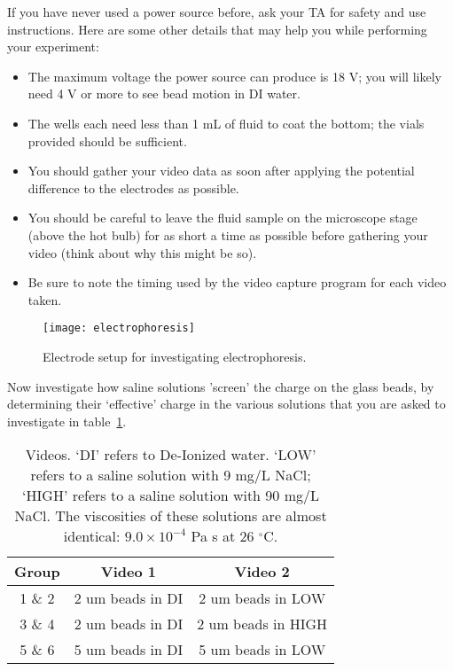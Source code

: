 \noindent
If you have never used a power source before, ask your TA for safety and use instructions. Here are some other details that may help you while performing your experiment:

\begin{itemize}
\itemsep-0.3em
\item The maximum voltage the power source can produce is 18 V; you will likely need 4 V or more to see bead motion in DI water.
\item The wells each need less than 1 mL of fluid to coat the bottom; the vials provided should be sufficient.
\item You should gather your video data as soon after applying the potential difference to the
electrodes as possible.
\item You should be careful to leave the fluid sample on the microscope stage (above the hot
bulb) for as short a time as possible before gathering your video (think about why this might
be so).
\item Be sure to note the timing used by the video capture program for each video taken.
\end{itemize}

\begin{figure}[hbtp]
	\centering
	\texttt{[image: electrophoresis]}
	\caption{Electrode setup for investigating electrophoresis.}
	\label{fig:electroph}
\end{figure}

Now investigate how saline solutions 'screen' the charge on the glass beads, by determining their `effective' charge in the various solutions that you are asked to investigate in table~\ref{tab:lab7-vids}.

\begin{table}[ht]
	\centering
	\begin{tabular}{|c|c|c|}
	\hline 
	\textbf{Group} & \textbf{Video 1} & \textbf{Video 2} \\ 
	\hline 
	1 \& 2 & 2 um beads in DI & 2 um beads in LOW \\ 
	\hline 
	3 \& 4 & 2 um beads in DI & 2 um beads in HIGH \\ 
	\hline 
	5 \& 6 & 5 um beads in DI & 5 um beads in LOW \\ 
	\hline 
	\end{tabular}
	\caption{Videos. `DI' refers to De-Ionized water. `LOW' refers to a saline solution with 9 mg/L NaCl; `HIGH' refers to a saline solution with 90 mg/L NaCl. The viscosities of these solutions are almost identical: $9.0 \times 10^{-4}$ Pa s at 26 $^{\circ}$C.}
	\label{tab:lab7-vids}
\end{table} 

